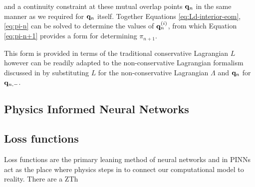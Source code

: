 \documentclass[10pt]{iopart}
\begin{document}
and a continuity constraint at these mutual overlap points $\vb q_n$ in the same manner as we required for $\vb q_n$ itself. Together Equations \eqref{eq:Ld-interior-eom}, \eqref{eq:pi-n} can be solved to determine the values of $\vb q^{(i)}_n$, from which Equation \eqref{eq:pi-n+1} provides a form for determining $\pi_{n + 1}$.

This form is provided in terms of the traditional conservative Lagrangian $L$ however can be readily adapted to the non-conservative Lagrangian formalism discussed in  by substituting $L$ for the non-conservative Lagrangian $\Lambda$ and $\vb q_n$ for $\vb q_{n, -}$.


%


\subsection{Physics Informed Neural Networks}
\label{sec:intro-pinn}

\subsection{Loss functions}
\label{sec:intro-lf}

Loss functions are the primary leaning method of neural networks and in PINNs act as the place where physics steps in to connect our computational model to reality. There are a ZTh



\end{document}

